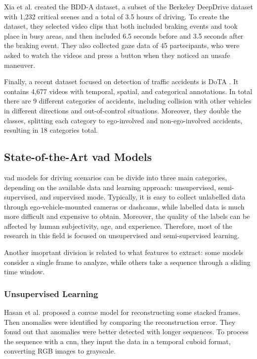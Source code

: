 Xia et al. created the BDD-A \cite{bdd_a} dataset, a subset of the Berkeley 
DeepDrive dataset \cite{bdd100k} with 1,232 critical scenes and a total of 
3.5 hours of driving. To create the dataset, they selected video clips that 
both included braking events and took place in busy areas, and then included 
6.5 seconds before and 3.5 seconds after the braking event.
They also collected gaze data of 45 partecipants, who were asked to watch 
the videos and press a button when they noticed an unsafe maneuver.

Finally, a recent dataset focused on detection of traffic accidents is DoTA 
\cite{dota_dataset}. It contains 4,677 videos with temporal, spatial, and 
categorical annotations. In total there are 9 different categories of accidents,
including collision with other vehicles in different directions and out-of-control 
situations. Moreover, they double the classes, splitting each category to 
ego-involved and non-ego-involved accidents, resulting in 18 categories total.

\subsection{State-of-the-Art \ac{vad} Models}
\acl{vad} models for driving scenarios can be divide into three main categories, 
depending on the available data and learning approach: 
unsupervised, semi-supervised, and supervised mode.
Typically, it is easy to collect unlabelled data through ego-vehicle-mounted 
cameras or dashcams, while labelled data is much more difficult and expensive 
to obtain. Moreover, the quality of the labels can be affected by human 
subjectivity, age, and experience. Therefore, most of the research in this 
field is focused on unsupervised and semi-supervised learning.

Another imoprtant division is related to what features to extract: some models 
consider a single frame to analyze, while others take a sequence through a 
sliding time window. 

\subsubsection{Unsupervised Learning}
Hasan et al. \cite{hasan_convae} proposed a \ac{convae} model for reconstructing 
some stacked frames. Then anomalies were identified by comparing the 
reconstruction error. They fonud out that anomalies were better detected with 
longer sequences. To process the sequence with a \ac{cnn}, they input the data 
in a temporal cuboid format, converting RGB images to grayscale.

